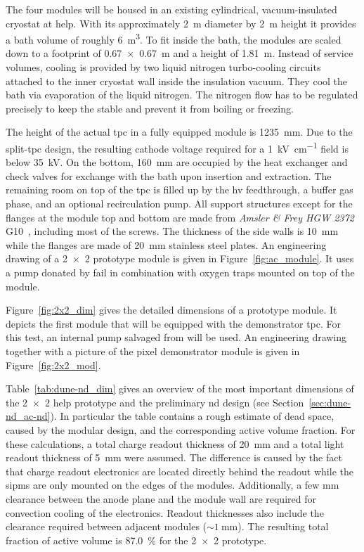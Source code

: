 The four modules will be housed in an existing cylindrical, vacuum-insulated cryostat at \gls{help}.
With its approximately \SI{2}{\metre} diameter by \SI{2}{\metre} height it provides a \lar{} bath volume of roughly \SI{6}{\metre\cubed}.
To fit inside the bath, the modules are scaled down to a footprint of \SI{0.67 x 0.67}{\metre} and a height of \SI{1.81}{\metre}.
Instead of service volumes, cooling is provided by two liquid nitrogen turbo-cooling circuits attached to the inner cryostat wall inside the insulation vacuum.
They cool the \lar{} bath via evaporation of the liquid nitrogen.
The nitrogen flow has to be regulated precisely to keep the \lar{} stable and prevent it from boiling or freezing.

The height of the actual \gls{tpc} in a fully equipped module is \SI{1235}{\milli\metre}.
Due to the split-\gls{tpc} design, the resulting cathode voltage required for a \SI{1}{\kilo\volt\per\centi\metre} field is below \SI{35}{\kilo\volt}.
On the bottom, \SI{160}{\milli\metre} are occupied by the heat exchanger and check valves for \lar{} exchange with the bath upon insertion and extraction.
The remaining room on top of the \gls{tpc} is filled up by the \gls{hv} feedthrough, a buffer gas phase, and an optional recirculation pump.
All support structures except for the flanges at the module top and bottom are made from \emph{Amsler \& Frey HGW 2372} G10~\cite{g10}, including most of the screws.
The thickness of the side walls is \SI{10}{\milli\metre} while the flanges are made of \SI{20}{\milli\metre} stainless steel plates.
An engineering drawing of a \num{2 x 2} prototype module is given in Figure~\ref{fig:ac_module}.
It uses a \lar{} pump donated by \gls{fail} in combination with oxygen traps mounted on top of the module.

Figure~\ref{fig:2x2_dim} gives the detailed dimensions of a prototype module.
It depicts the first module that will be equipped with the demonstrator \gls{tpc}.
For this test, an internal pump salvaged from \AT{} will be used.
An engineering drawing together with a picture of the pixel demonstrator module is given in Figure~\ref{fig:2x2_mod}.

Table~\ref{tab:dune-nd_dim} gives an overview of the most important dimensions of the \num{2 x 2} \gls{help} prototype and the preliminary \gls{nd} design (see Section~\ref{sec:dune-nd_ac-nd}).
In particular the table contains a rough estimate of dead space, caused by the modular design, and the corresponding active volume fraction.
For these calculations, a total charge readout thickness of \SI{20}{\milli\metre} and a total light readout thickness of \SI{5}{\milli\metre} were assumed.
The difference is caused by the fact that charge readout electronics are located directly behind the readout while the \glspl{sipm} are only mounted on the edges of the \AL{} modules.
Additionally, a few \si{\milli\metre} clearance between the anode plane and the module wall are required for convection cooling of the \larpix{} electronics.
Readout thicknesses also include the clearance required between adjacent modules ($\sim{\SI{1}{\milli\metre}}$).
The resulting total fraction of active volume is \SI{87.0}{\percent} for the \num{2 x 2} prototype.

